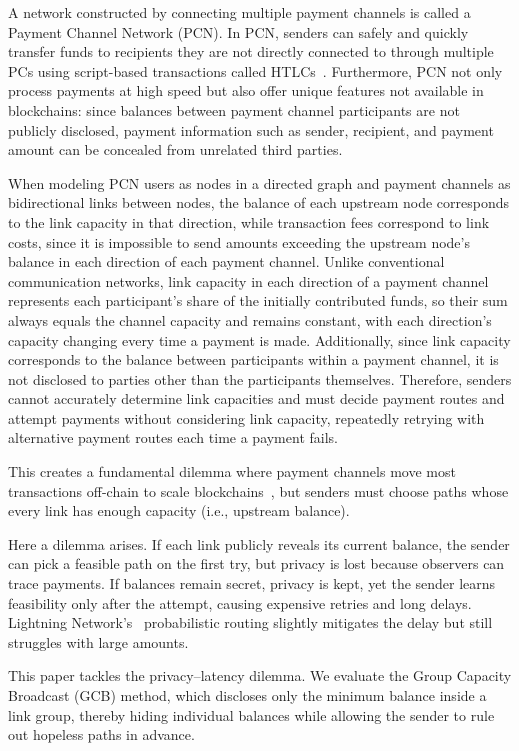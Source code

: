 \documentclass[conference]{IEEEtran}
\begin{document}
A network constructed by connecting multiple payment channels is called a Payment Channel Network (PCN).
In PCN, senders can safely and quickly transfer funds to recipients they are not directly connected to through multiple PCs using script-based transactions called HTLCs~\cite{poon_dryja_2016}.
Furthermore, PCN not only process payments at high speed but also offer unique features not available in blockchains: since balances between payment channel participants are not publicly disclosed, payment information such as sender, recipient, and payment amount can be concealed from unrelated third parties.

When modeling PCN users as nodes in a directed graph and payment channels as bidirectional links between nodes, the balance of each upstream node corresponds to the link capacity in that direction, while transaction fees correspond to link costs, since it is impossible to send amounts exceeding the upstream node's balance in each direction of each payment channel.
Unlike conventional communication networks, link capacity in each direction of a payment channel represents each participant's share of the initially contributed funds, so their sum always equals the channel capacity and remains constant, with each direction's capacity changing every time a payment is made.
Additionally, since link capacity corresponds to the balance between participants within a payment channel, it is not disclosed to parties other than the participants themselves.
Therefore, senders cannot accurately determine link capacities and must decide payment routes and attempt payments without considering link capacity, repeatedly retrying with alternative payment routes each time a payment fails.

This creates a fundamental dilemma where payment channels move most transactions off-chain to scale blockchains~\cite{poon_dryja_2016}, but senders must choose paths whose every link has enough capacity (i.e., upstream balance).

Here a dilemma arises.
If each link publicly reveals its current balance, the sender can pick a feasible path on the first try, but privacy is lost because observers can trace payments.
If balances remain secret, privacy is kept, yet the sender learns feasibility only after the attempt, causing expensive retries and long delays.
Lightning Network's~\cite{lnbolt} probabilistic routing slightly mitigates the delay but still struggles with large amounts.

This paper tackles the privacy–latency dilemma.
We evaluate the Group Capacity Broadcast (GCB) method, which discloses only the minimum balance inside a link group, thereby hiding individual balances while allowing the sender to rule out hopeless paths in advance.
\end{document}

